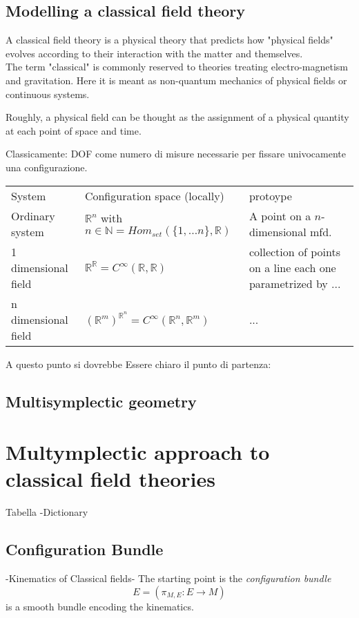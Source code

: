 \documentclass[a4paper,12pt,fleqn]{article}  %
\begin{document}
\subsection{Modelling a classical field theory}
A classical field theory is a physical theory that predicts how "physical fields" evolves according to their interaction with the matter and themselves.
\\
The term "classical" is commonly reserved to theories treating electro-magnetism and gravitation. Here it is meant as non-quantum mechanics of physical fields or continuous systems.

Roughly, a physical field can be thought as the assignment of a physical quantity at each point of space and time.


Classicamente: DOF come numero di misure necessarie per fissare univocamente una configurazione.
\begin{table}[]
\begin{tabular}{lll}
	System & Configuration space (locally) & protoype 
 	\\
	Ordinary system & $\mathbb{R}^n$ with $n\in \mathbb{N} = Hom_{set}(\{1,\ldots n\}, \mathbb{R})$ & A point on a $n$-dimensional mfd.
	\\
	1 dimensional field & $\mathbb{R}^\mathbb{R} = C^\infty(\mathbb{R},\mathbb{R})$ & collection of points on a line each one parametrized by ...
	\\
	n dimensional field & $(\mathbb{R}^m)^{\mathbb{R}^n} = C^\infty (\mathbb{R}^n, \mathbb{R}^m)$ & ...
\end{tabular}
\end{table}

A questo punto si dovrebbe Essere chiaro il punto di partenza:
\\

\subsection{Multisymplectic geometry}


\section{Multymplectic approach to classical field theories}
Tabella -Dictionary


\subsection{Configuration Bundle}
-Kinematics of Classical fields-
The starting point is the \emph{configuration bundle} 
 	\begin{displaymath}
 		E = \left( \pi_{M,E} : E\rightarrow M \right)
 	\end{displaymath}
is a smooth bundle encoding the kinematics.
\end{document}
